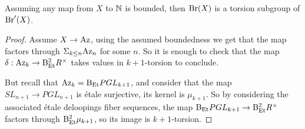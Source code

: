 \begin{lemma}
Assuming any map from $X$ to $\mathbb{N}$ is bounded, then $\mathrm{Br}(X)$ is a torsion subgroup of $\mathrm{Br}'(X)$.
\end{lemma}

\begin{proof}
Assume $X\to {\mathrm{Az}}$, using the assumed boundedness we get that the map factors through $\Sigma_{k\leq n}{\mathrm{Az}}_n$ for some $n$.
So it is enough to check that the map $\delta:{\mathrm{Az}}_k \to \mathrm{B}^2_{{\mathrm{Et}}}R^\times$ takes values in $k+1$-torsion to conclude.

But recall that ${\mathrm{Az}}_k = \mathrm{B}_{{\mathrm{Et}}}PGL_{k+1}$, and consider that the map $SL_{n+1}\to PGL_{n+1}$ is \'etale surjective, its kernel is $\mu_{k+1}$. So by considering the associated \'etale deloopings fiber sequences, the map $\mathrm{B}_{{\mathrm{Et}}}PGL_{k+1}\to \mathrm{B}^2_{{\mathrm{Et}}}R^\times$ factors through $\mathrm{B}_{{\mathrm{Et}}}^2\mu_{k+1}$, so its image is $k+1$-torsion.
\end{proof}






